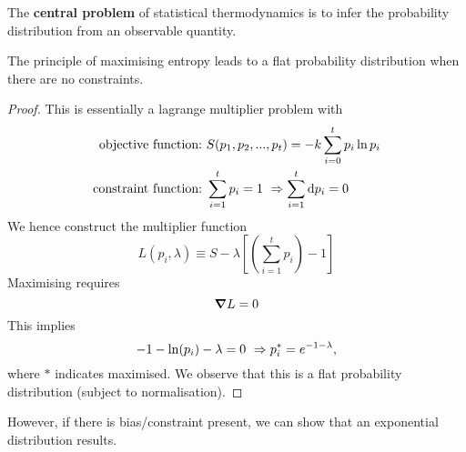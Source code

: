 The \textbf{central problem} of statistical thermodynamics is to infer the probability distribution from an observable quantity. 
\begin{thrm}
The principle of maximising entropy leads to a flat probability distribution when there are no constraints. 
\end{thrm}
\begin{proof}
This is essentially a lagrange multiplier problem with
\begin{subequations}
\begin{align}
\text{objective function:\ }&S(p_1,p_2,...,p_t)=-k\sum_{i=0}^t p_i\ln{p_i} \\
\text{constraint function:\ }&\sum_{i=1}^{t}p_i=1\ \imp\sum^t_{i=1}\dif p_i=0
\end{align}
\end{subequations}
We hence construct the multiplier function  
\begin{equation}
L(p_i,\lambda)\equiv S-\lambda\left[\left(\sum_{i=1}^{t}p_i\right)-1\right]
\end{equation}
Maximising requires 
\begin{equation}
\nab L=0
\end{equation}
This implies 
\begin{equation}
-1-\ln(p_i)-\lambda=0\ \Rightarrow p_i^*=e^{-1-\lambda}, 
\end{equation}
where $*$ indicates maximised. 
We observe that this is a flat probability distribution (subject to normalisation). 
\end{proof}
\begin{thrm}
However, if there is bias/constraint present, we can show that an exponential distribution results. 
\end{thrm}

